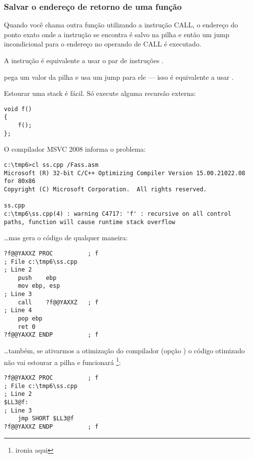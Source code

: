 \subsubsection{Salvar o endereço de retorno de uma função}


Quando você chama outra função utilizando a instrução CALL, o endereço do ponto exato onde a 
instrução \CALL se encontra é salvo na pilha e então um jump incondicional para o endereço no operando de CALL é executado.

A instrução \CALL é equivalente a usar o par de instruções .

\RET pega um valor da pilha e usa um jump para ele --- isso é equivalente a usar .

\myindex{\Recursion}
Estourar uma stack é fácil. Só execute alguma recursão externa:

\begin{lstlisting}
void f()
{
	f();
};
\end{lstlisting}

O compilador MSVC 2008 informa o problema:

\begin{lstlisting}
c:\tmp6>cl ss.cpp /Fass.asm
Microsoft (R) 32-bit C/C++ Optimizing Compiler Version 15.00.21022.08 for 80x86
Copyright (C) Microsoft Corporation.  All rights reserved.

ss.cpp
c:\tmp6\ss.cpp(4) : warning C4717: 'f' : recursive on all control paths, function will cause runtime stack overflow
\end{lstlisting}

\dots mas gera o código de qualquer maneira:

\begin{lstlisting}
?f@@YAXXZ PROC			; f
; File c:\tmp6\ss.cpp
; Line 2
	push	ebp
	mov	ebp, esp
; Line 3
	call	?f@@YAXXZ	; f
; Line 4
	pop	ebp
	ret	0
?f@@YAXXZ ENDP			; f
\end{lstlisting}

\dots também, se ativarmos a otimização do compilador (opção ) 
o código otimizado não vai estourar a pilha e funcionará  \footnote{ironia aqui}:

\begin{lstlisting}
?f@@YAXXZ PROC			; f
; File c:\tmp6\ss.cpp
; Line 2
$LL3@f:
; Line 3
	jmp	SHORT $LL3@f
?f@@YAXXZ ENDP			; f
\end{lstlisting}

\PTBRph{}

